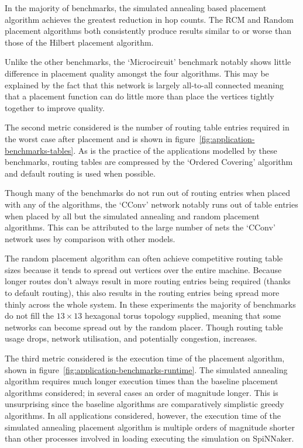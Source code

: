 				In the majority of benchmarks, the simulated annealing based placement
				algorithm achieves the greatest reduction in hop counts. The RCM and
				Random placement algorithms both consistently produce results similar
				to or worse than those of the Hilbert placement algorithm.
				
				Unlike the other benchmarks, the `Microcircuit' benchmark notably shows
				little difference in placement quality amongst the four algorithms.
				This may be explained by the fact that this network is largely
				all-to-all connected meaning that a placement function can do little
				more than place the vertices tightly together to improve quality.
				
				The second metric considered is the number of routing table entries
				required in the worst case after placement and is shown in
				figure~\ref{fig:application-benchmarks-tables}. As is the practice of
				the applications modelled by these benchmarks, routing tables are
				compressed by the `Ordered Covering' algorithm~\cite{mundy16} and
				default routing is used when possible.
				
				Though many of the benchmarks do not run out of routing entries when
				placed with any of the algorithms, the `CConv' network notably runs out
				of table entries when placed by all but the simulated annealing and
				random placement algorithms. This can be attributed to the large number
				of nets the `CConv' network uses by comparison with other models.
				
				The random placement algorithm can often achieve competitive routing
				table sizes because it tends to spread out vertices over the entire
				machine. Because longer routes don't always result in more routing
				entries being required (thanks to default routing), this also results
				in the routing entries being spread more thinly across the whole
				system. In these experiments the majority of benchmarks do not fill the
				$13\times13$ hexagonal torus topology supplied, meaning that some
				networks can become spread out by the random placer. Though routing
				table usage drops, network utilisation, and potentially congestion,
				increases.
				
				The third metric considered is the execution time of the placement
				algorithm, shown in figure~\ref{fig:application-benchmarks-runtime}.
				The simulated annealing algorithm requires much longer execution times
				than the baseline placement algorithms considered; in several cases an
				order of magnitude longer. This is unsurprising since the baseline
				algorithms are comparatively simplistic greedy algorithms. In all
				applications considered, however, the execution time of the simulated
				annealing placement algorithm is multiple orders of magnitude shorter
				than other processes involved in loading executing the simulation on
				SpiNNaker.
				
